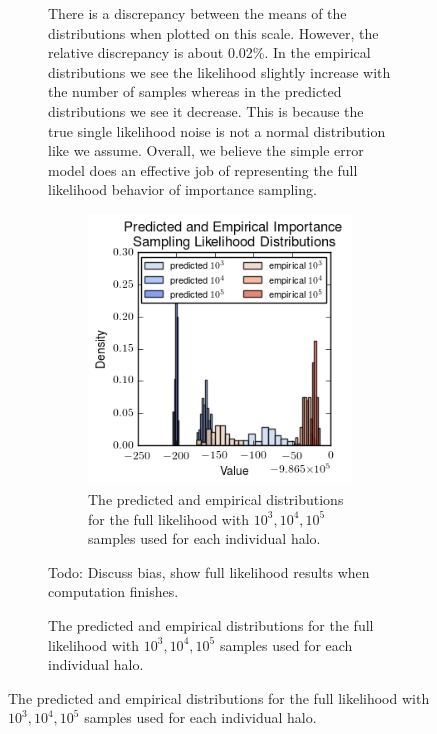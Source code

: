 \documentclass[\docopts]{\docclass}
\begin{document}
\begin{figure}[h!]
\begin{figure}[h!]
There is a discrepancy between the means of the distributions when plotted on this scale. However, the relative discrepancy is about 0.02\%. In the empirical distributions we see the likelihood slightly increase with the number of samples whereas in the predicted distributions we see it decrease. This is because the true single likelihood noise is not a normal distribution like we assume. Overall, we believe the simple error model does an effective job of representing the full likelihood behavior of importance sampling. 

\begin{figure}[h]
\centering
\includegraphics[width=0.9\columnwidth]{pred_err.png}
\caption{
The predicted and empirical distributions for the full likelihood with $10^3, 10^4, 10^5$ samples used for each individual halo. 
\label{fig:pred_err}}
\end{figure}

Todo: Discuss bias, show full likelihood results when computation finishes.




\end{figure}
\end{figure}
\end{document}
